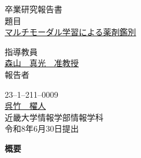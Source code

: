 \documentclass[dvipdfmx]{jsarticle}
\begin{document}
\pagestyle{empty}

\begin{center}
\vspace*{1cm}
\large
{\LARGE 卒業研究報告書}\\
\vspace*{0.8cm}
題目\\
\vspace*{1cm}
{\Huge \underline{マルチモーダル学習による薬剤鑑別}}\\
\vspace{3mm}

\vspace*{3cm}
指導教員\\
\vspace*{0.3cm}
\underline{\LARGE 森山　真光　准教授}\\
\vspace*{3cm}
報告者\\
\vspace*{0.3cm}

{23--1--211--0009}\\
\vspace*{0.3cm}
\underline{\Huge 呉竹　櫂人}\\
\vspace*{0.5cm}
近畿大学情報学部情報学科\\
\vspace*{2cm}
令和8年6月30日提出\\
\end{center}

\newpage
\normalsize

\clearpage
\begin{center}
{\bf \Large 概要}
\end{center}
\end{document}
